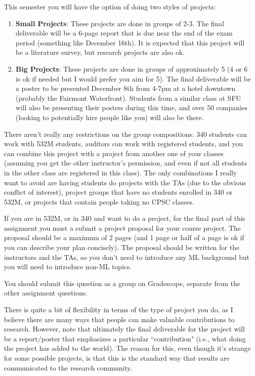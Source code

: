 \documentclass{article}
\def\blu#1{{\color{blu}#1}}
\def\enum#1{\begin{enumerate}#1\end{enumerate}}
\begin{document}
This semester you will have the option of doing two styles of projects:
\enum{
\item \textbf{Small Projects}: These projects are done in \blu{groups of 2-3}. The final deliverable will be a \blu{6-page report that is due near the end of the exam period} (something like December 16th). It is expected that this project will be a literature survey, but research projects are also ok.
\item \textbf{Big Projects}: These projects are done in \blu{groups of approximately 5} (4 or 6 is ok if needed but I would prefer you aim for 5). The final deliverable will be a \blu{poster to be presented December 8th} from 4-7pm at a hotel downtown (probably the Fairmont Waterfront). Students from a similar class at SFU will also be presenting their posters during this time, and over 50 companies (looking to potentially hire people like you) will also be there.
}
There aren't really any restrictions on the group compositions: 340 students can work with 532M students, auditors can work with registered students, and you can combine this project with a project from another one of your classes (assuming you get the other instructor's permission, and even if not all students in the other class are registered in this class). The only combinations I really want to avoid are having students do projects with the TAs (due to the obvious conflict of interest), project groups that have no students enrolled in 340 or 532M, or projects that contain people taking no CPSC classes.

If you are in 532M, or in 340 and want to do a project, for the final part of this assignment you must a \blu{submit a project proposal} for your course project. The proposal should be a maximum of 2 pages (and 1 page or half of a page is ok if you can describe your plan concisely). The proposal should be written for the instructors and the TAs, so you don't need to introduce any ML background but you will need to introduce non-ML topics. 

\blu{You should submit this question as a group on Gradescope, separate from the other assignment questions.} 

There is quite a bit of flexibility in terms of the type of project you do, as I believe there are many ways that people can make valuable contributions to research. However, note that ultimately the final deliverable for the project will be a report/poster that emphasizes a particular ``contribution" (i.e., what doing the project has added to the world).
The reason for this, even though it's strange for some possible projects, is that this is the standard way that results are communicated to the research community.
\end{document}
